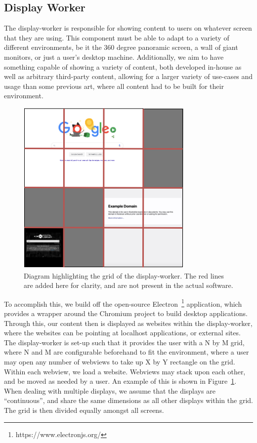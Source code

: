 \subsection{Display Worker}\label{sec:display-worker}

The display-worker is responsible for showing content to users on whatever screen
that they are using. This component must be able to adapt to a variety of different
environments, be it the 360 degree panoramic screen, a wall of giant monitors, or 
just a user's desktop machine. Additionally, we aim to have something capable of 
showing a variety of content, both developed in-house as well as arbitrary 
third-party content, allowing for a larger variety of use-cases and usage than
some previous art, where all content had to be built for their environment.

\begin{figure}
    \centering
    \includegraphics[width=0.5\columnwidth]{chapters/02_technology/figures/display_server.png}
    \caption{Diagram highlighting the grid of the display-worker. The red lines are added here for clarity, and are not present in the actual software.}
    \label{fig:display_server_grid}
\end{figure}

To accomplish this, we build off the open-source 
Electron~\footnote{https://www.electronjs.org/} application, which provides a
wrapper around the Chromium project to build desktop applications. Through this,
our content then is displayed as websites within the display-worker, where the 
websites can be pointing at localhost applications, or external sites. The 
display-worker is set-up such that it provides the user with a N by M grid, where
N and M are configurable beforehand to fit the environment, where a user may open
any number of webviews to take up X by Y rectangle on the grid. Within each
webview, we load a website. Webviews may stack upon each other, and be moved as 
needed by a user. An example of this is shown in 
Figure~\ref{fig:display_server_grid}. When dealing with multiple displays, we
assume that the displays are ``continuous'', and share the same dimensions as
all other displays within the grid. The grid is then divided equally amongst all 
screens.

